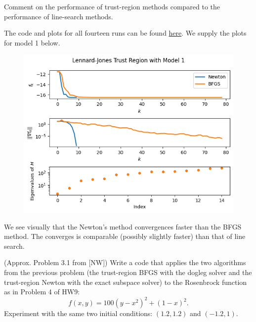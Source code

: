 \documentclass{../kin_math}
\begin{document}
\begin{questions}
  Comment on the performance of trust-region methods compared to the performance of line-search methods.
  \begin{solution}
    The code and plots for all fourteen runs can be found \href{https://github.com/elijahkin/amsc660/blob/main/hw11/hw11.ipynb}{here}. We supply the plots for model 1 below.
    \begin{figure}
      \centering
      \includegraphics[scale=0.6]{lennard_jones.png}
    \end{figure}
    We see visually that the Newton's method convergences faster than the BFGS method. The converges is comparable (possibly slightly faster) than that of line search.
  \end{solution}

  \question (Approx. Problem 3.1 from [NW]) Write a code that applies the two algorithms from the previous problem (the trust-region BFGS with the dogleg solver and the trust-region Newton with the exact subspace solver) to the Rosenbrock function as in Problem 4 of HW9:
  \begin{equation}
    f(x, y) = 100(y - x^2)^2 + (1 - x)^2.
  \end{equation}
  Experiment with the same two initial conditions: $(1.2, 1.2)$ and $(-1.2, 1)$.


\end{questions}
\end{document}
